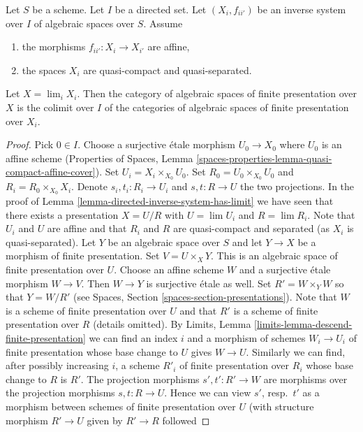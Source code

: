 \begin{lemma}
\label{lemma-descend-finite-presentation}
Let $S$ be a scheme. Let $I$ be a directed set.
Let $(X_i, f_{ii'})$ be an inverse system over $I$ of algebraic spaces
over $S$. Assume
\begin{enumerate}
\item the morphisms $f_{ii'} : X_i \to X_{i'}$ are affine,
\item the spaces $X_i$ are quasi-compact and quasi-separated.
\end{enumerate}
Let $X = \lim_i X_i$. Then the category of algebraic spaces
of finite presentation over $X$ is the colimit over $I$ of the
categories of algebraic spaces of finite presentation over $X_i$.
\end{lemma}

\begin{proof}
Pick $0 \in I$. Choose a surjective \'etale morphism $U_0 \to X_0$ where
$U_0$ is an affine scheme (Properties of Spaces, Lemma
\ref{spaces-properties-lemma-quasi-compact-affine-cover}).
Set $U_i = X_i \times_{X_0} U_0$. Set $R_0 = U_0 \times_{X_0} U_0$ and
$R_i = R_0 \times_{X_0} X_i$. Denote $s_i, t_i : R_i \to U_i$ and
$s, t : R \to U$ the two projections. In the proof of
Lemma \ref{lemma-directed-inverse-system-has-limit} we have
seen that there exists a presentation $X = U/R$ with
$U = \lim U_i$ and $R = \lim R_i$. Note that $U_i$ and $U$ are affine and
that $R_i$ and $R$ are quasi-compact and separated (as $X_i$ is
quasi-separated). Let $Y$ be an algebraic space over $S$ and let
$Y \to X$ be a morphism of finite presentation. Set $V = U \times_X Y$.
This is an algebraic space of finite presentation over $U$.
Choose an affine scheme $W$ and a surjective \'etale morphism $W \to V$.
Then $W \to Y$ is surjective \'etale as well. Set $R' = W \times_Y W$
so that $Y = W/R'$ (see Spaces, Section \ref{spaces-section-presentations}).
Note that $W$ is a scheme of finite presentation over $U$ and that $R'$
is a scheme of finite presentation over $R$ (details omitted).
By Limits, Lemma \ref{limits-lemma-descend-finite-presentation}
we can find an index $i$ and a morphism of schemes $W_i \to U_i$ of
finite presentation whose base change to $U$ gives $W \to U$. Similarly
we can find, after possibly increasing $i$, a scheme $R'_i$ of finite
presentation over $R_i$ whose base change to $R$ is $R'$.
The projection morphisms $s', t' : R' \to W$ are morphisms over
the projection morphisms $s, t : R \to U$. Hence we can view $s'$,
resp.\ $t'$ as a morphism between schemes of finite presentation over
$U$ (with structure morphism $R' \to U$ given by $R' \to R$ followed

\end{proof}
